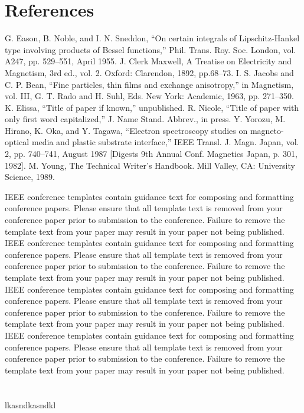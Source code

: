 \documentclass[conference]{IEEEtran}
\begin{document}
\section*{References}

\begin{thebibliography}{00}
 G. Eason, B. Noble, and I. N. Sneddon, ``On certain integrals of Lipschitz-Hankel type involving products of Bessel functions,'' Phil. Trans. Roy. Soc. London, vol. A247, pp. 529--551, April 1955.
 J. Clerk Maxwell, A Treatise on Electricity and Magnetism, 3rd ed., vol. 2. Oxford: Clarendon, 1892, pp.68--73.
 I. S. Jacobs and C. P. Bean, ``Fine particles, thin films and exchange anisotropy,'' in Magnetism, vol. III, G. T. Rado and H. Suhl, Eds. New York: Academic, 1963, pp. 271--350.
 K. Elissa, ``Title of paper if known,'' unpublished.
 R. Nicole, ``Title of paper with only first word capitalized,'' J. Name Stand. Abbrev., in press.
 Y. Yorozu, M. Hirano, K. Oka, and Y. Tagawa, ``Electron spectroscopy studies on magneto-optical media and plastic substrate interface,'' IEEE Transl. J. Magn. Japan, vol. 2, pp. 740--741, August 1987 [Digests 9th Annual Conf. Magnetics Japan, p. 301, 1982].
 M. Young, The Technical Writer's Handbook. Mill Valley, CA: University Science, 1989.
\end{thebibliography}
\vspace{12pt}
IEEE conference templates contain guidance text for composing and formatting conference papers. Please ensure that all template text is removed from your conference paper prior to submission to the conference. Failure to remove the template text from your paper may result in your paper not being published.
IEEE conference templates contain guidance text for composing and formatting conference papers. Please ensure that all template text is removed from your conference paper prior to submission to the conference. Failure to remove the template text from your paper may result in your paper not being published.
IEEE conference templates contain guidance text for composing and formatting conference papers. Please ensure that all template text is removed from your conference paper prior to submission to the conference. Failure to remove the template text from your paper may result in your paper not being published.
IEEE conference templates contain guidance text for composing and formatting conference papers. Please ensure that all template text is removed from your conference paper prior to submission to the conference. Failure to remove the template text from your paper may result in your paper not being published.
\newpage
\onecolumn
\begin{appendices}
\section{}
lkasndkasndkl
\newpage
\section{}
\end{appendices}
\end{document}
